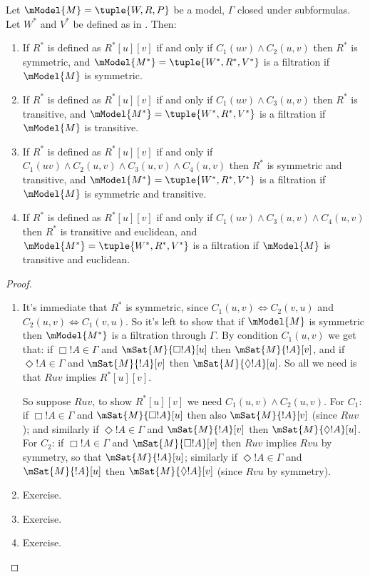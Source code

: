 \documentclass[../../../include/open-logic-section]{subfiles}
\begin{document}
\begin{thm}
  Let $\mModel{M} =\tuple{W,R,P}$ be a model, $\Gamma$ closed under
  subformulas. Let $W^*$ and $V^*$ be defined as in
  . Then:
  \begin{enumerate}
  \item If $R^*$ is defined as $R^*[u][v]$ if and only if $C_1(uv)
    \land C_2(u,v)$ then $R^*$ is symmetric, and
    $\mModel{M^*} = \tuple{W^*,R^*,V^*}$ is a filtration if $\mModel{M}$
    is symmetric.
  \item If $R^*$ is defined as $R^*[u][v]$ if and only if $C_1(uv)
    \land C_3(u,v)$ then $R^*$ is transitive, and
    $\mModel{M^*}=\tuple{W^*,R^*,V^*}$ is a filtration if $\mModel{M}$
    is transitive.
  \item If $R^*$ is defined as $R^*[u][v]$ if and only if $C_1(uv)
    \land C_2(u,v) \land C_3(u,v) \land C_4(u,v)$ then $R^*$ is
    symmetric and transitive, and $\mModel{M^*}=\tuple{W^*,R^*,V^*}$
    is a filtration if $\mModel{M}$ is symmetric and transitive.
  \item If $R^*$ is defined as $R^*[u][v]$ if and only if $C_1(uv)
    \land C_3(u,v) \land C_4(u,v)$ then $R^*$ is transitive and
    euclidean, and $\mModel{M^*}=\tuple{W^*,R^*,V^*}$ is a filtration
    if $\mModel{M}$ is transitive and euclidean.
  \end{enumerate}
\end{thm}

\begin{proof}
  \begin{enumerate}
    \item It's immediate that $R^*$ is symmetric, since $C_1(u,v)
      \Leftrightarrow C_2(v,u)$ and $C_2(u,v) \Leftrightarrow
      C_1(v,u)$. So it's left to show that if $\mModel{M}$ is
      symmetric then $\mModel{M^*}$ is a filtration through
      $\Gamma$. By condition $C_1(u,v)$ we get that: if $\Box!A \in
      \Gamma$ and $\mSat{M}{\Box!A}[u]$ then $\mSat{M}{!A}[v]$, and if
      $\Diamond!A \in \Gamma$ and $\mSat{M}{!A}[v]$ then
      $\mSat{M}{\Diamond!A}[u]$. So all we need is that $Ruv$ implies
      $R^*[u][v]$.

      So suppose $Ruv$, to show $R^*[u][v]$ we need $C_1(u,v) \land
      C_2(u,v)$. For $C_1$: if $\Box!A \in\Gamma$ and
      $\mSat{M}{\Box!A}[u]$ then also $\mSat{M}{!A}[v]$ (since $Ruv$);
      and similarly if $\Diamond!A \in \Gamma$ and $\mSat{M}{!A}[v]$
      then $\mSat{M}{\Diamond!A}[u]$. For $C_2$: if $\Box!A \in
      \Gamma$ and $\mSat{M}{\Box!A}[v]$ then $Ruv$ implies $Rvu$ by
      symmetry, so that $\mSat{M}{!A}[u]$; similarly if $\Diamond!A
      \in\Gamma$ and $\mSat{M}{!A}[u]$ then $\mSat{M}{\Diamond!A}[v]$
      (since $Rvu$ by symmetry).
    \item Exercise.
    \item Exercise.
    \item Exercise.
  \end{enumerate}
\end{proof}
\end{document}
